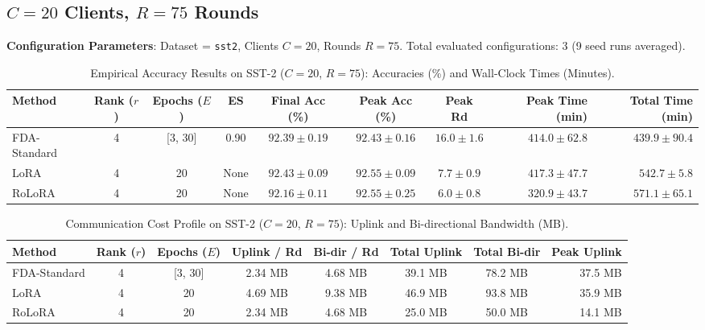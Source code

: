 \documentclass[10pt,a4paper]{article}
\begin{document}
\clearpage
\subsection{\texorpdfstring{$C=20$ Clients, $R=75$ Rounds}{C=20 Clients, R=75 Rounds}}

\textbf{Configuration Parameters}: Dataset = \texttt{sst2}, Clients $C = 20$, Rounds $R = 75$. Total evaluated configurations: 3 (9 seed runs averaged).

\begin{table}[H]
\centering
\caption{Empirical Accuracy Results on SST-2 ($C=20$, $R=75$): Accuracies (\%) and Wall-Clock Times (Minutes).}
\scriptsize
\setlength{\tabcolsep}{3.5pt}
\begin{tabular*}{\textwidth}{@{\extracolsep{\fill}}lccccccrr@{}}
\toprule
\textbf{Method} & \textbf{Rank ($r$)} & \textbf{Epochs ($E$)} & \textbf{ES} & \textbf{Final Acc (\%)} & \textbf{Peak Acc (\%)} & \textbf{Peak Rd} & \textbf{Peak Time (min)} & \textbf{Total Time (min)} \\
\midrule
FDA-Standard & 4 & [3, 30] & 0.90 & $92.39 \pm 0.19$ & $92.43 \pm 0.16$ & $16.0 \pm 1.6$ & $414.0 \pm 62.8$ & $439.9 \pm 90.4$ \\
LoRA & 4 & 20 & None & $\mathbf{92.43 \pm 0.09}$ & $\mathbf{92.55 \pm 0.09}$ & $7.7 \pm 0.9$ & $417.3 \pm 47.7$ & $542.7 \pm 5.8$ \\
RoLoRA & 4 & 20 & None & $92.16 \pm 0.11$ & $\mathbf{92.55 \pm 0.25}$ & $6.0 \pm 0.8$ & $\mathbf{320.9 \pm 43.7}$ & $571.1 \pm 65.1$ \\
\bottomrule
\end{tabular*}
\end{table}

\begin{table}[H]
\centering
\caption{Communication Cost Profile on SST-2 ($C=20$, $R=75$): Uplink and Bi-directional Bandwidth (MB).}
\scriptsize
\setlength{\tabcolsep}{4.0pt}
\begin{tabular*}{\textwidth}{@{\extracolsep{\fill}}lccccccr@{}}
\toprule
\textbf{Method} & \textbf{Rank ($r$)} & \textbf{Epochs ($E$)} & \textbf{Uplink / Rd} & \textbf{Bi-dir / Rd} & \textbf{Total Uplink} & \textbf{Total Bi-dir} & \textbf{Peak Uplink} \\
\midrule
FDA-Standard & 4 & [3, 30] & 2.34 MB & 4.68 MB & 39.1 MB & 78.2 MB & 37.5 MB \\
LoRA & 4 & 20 & 4.69 MB & 9.38 MB & 46.9 MB & 93.8 MB & 35.9 MB \\
RoLoRA & 4 & 20 & 2.34 MB & 4.68 MB & 25.0 MB & 50.0 MB & 14.1 MB \\
\bottomrule
\end{tabular*}
\end{table}
\end{document}
